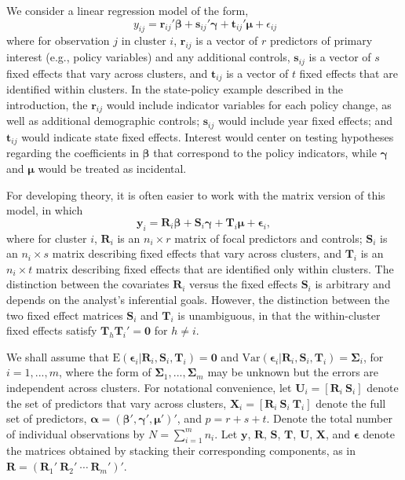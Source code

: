 \documentclass[12pt]{article}\usepackage[]{graphicx}\usepackage[]{color}
\newcommand{\E}{\text{E}}
\newcommand{\Var}{\text{Var}}
\newcommand{\bm}{\mathbf}
\newcommand{\bs}{\boldsymbol}
\begin{document}
We consider a linear regression model of the form,
\begin{equation}
\label{eq:fixed_effects_ij}
\ {y}_{ij} = \bm{r}_{ij}' \bs\beta + \bm{s}_{ij}' \bs\gamma + \bm{t}_{ij}' \bs\mu + \epsilon_{ij} 
\end{equation}
where for observation $j$ in cluster $i$, $\bm{r}_{ij}$ is a vector of $r$ predictors of primary interest (e.g., policy variables) and any additional controls, $\bm{s}_{ij}$ is a vector of $s$ fixed effects that vary across clusters, and $\bm{t}_{ij}$ is a vector of $t$ fixed effects that are identified within clusters. In the state-policy example described in the introduction, the $\bm{r}_{ij}$ would include indicator variables for each policy change, as well as additional demographic controls; $\bm{s}_{ij}$ would include year fixed effects; and $\bm{t}_{ij}$ would indicate state fixed effects. Interest would center on testing hypotheses regarding the coefficients in $\bs\beta$ that correspond to the policy indicators, while $\bs\gamma$ and $\bs\mu$ would be treated as incidental. 

For developing theory, it is often easier to work with the matrix version of this model, in which
\begin{equation}
\label{eq:fixed_effects}
\bm{y}_i = \bm{R}_i \bs\beta + \bm{S}_i \bs\gamma + \bm{T}_i \bs\mu + \bs\epsilon_i,
\end{equation}
where for cluster $i$, $\bm{R}_i$ is an $n_i \times r$ matrix of focal predictors and controls; $\bm{S}_i$ is an $n_i \times s$ matrix describing fixed effects that vary across clusters, and $\bm{T}_i$ is an $n_i \times t$ matrix describing fixed effects that are identified only within clusters. The distinction between the covariates $\bm{R}_i$ versus the fixed effects $\bm{S}_i$ is arbitrary and depends on the analyst's inferential goals. However, the distinction between the two fixed effect matrices $\bm{S}_i$ and $\bm{T}_i$ is unambiguous, in that the within-cluster fixed effects satisfy $\bm{T}_h \bm{T}_i' = \bm{0}$ for $h \neq i$. 

We shall assume that $\E\left(\bs\epsilon_i\left|\bm{R}_i,\bm{S}_i, \bm{T}_i\right.\right) = \bm{0}$ and $\Var\left(\bs\epsilon_i\left|\bm{R}_i,\bm{S}_i,\bm{T}_i\right.\right) = \bs\Sigma_i$, for $i = 1,...,m$, where the form of $\bs\Sigma_1,...,\bs\Sigma_m$ may be unknown but the errors are independent across clusters. 
For notational convenience, let $\bm{U}_i = \left[\bm{R}_i \ \bm{S}_i \right]$ denote the set of predictors that vary across clusters, $\bm{X}_i = \left[\bm{R}_i \ \bm{S}_i \ \bm{T}_i \right]$ denote the full set of predictors, $\bs\alpha = \left(\bs\beta', \bs\gamma', \bs\mu' \right)'$, and $p = r + s + t$.
Denote the total number of individual observations by $N = \sum_{i=1}^m n_i$.
Let $\bm{y}$, $\bm{R}$, $\bm{S}$, $\bm{T}$, $\bm{U}$, $\bm{X}$, and $\bs\epsilon$ denote the matrices obtained by stacking their corresponding components, as in $\bm{R} = \left(\bm{R}_1' \ \bm{R}_2' \ \cdots \ \bm{R}_m'\right)'$. 
\end{document}
